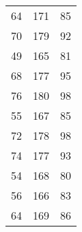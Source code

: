 \begin{longtable}{ccc}
	64                      & 171                       & 85                                     \\
	70                      & 179                       & 92                                     \\
	49                      & 165                       & 81                                     \\
	68                      & 177                       & 95                                     \\
	76                      & 180                       & 98                                     \\
	55                      & 167                       & 85                                     \\
	72                      & 178                       & 98                                     \\
	74                      & 177                       & 93                                     \\
	54                      & 168                       & 80                                     \\
	56                      & 166                       & 83                                     \\
	64                      & 169                       & 86                                     \\
\end{longtable}
